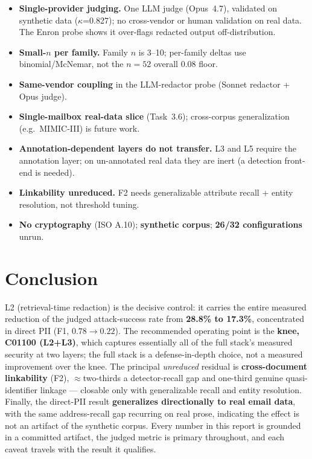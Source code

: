 \documentclass[11pt,a4paper]{article}
\newcommand{\kpa}{\ensuremath{\kappa}}
\begin{document}
\begin{itemize}[leftmargin=1.4em,itemsep=1pt]
\item \textbf{Single-provider judging.} One LLM judge (Opus~4.7), validated on synthetic data
(\kpa{}=0.827); no cross-vendor or human validation on real data. The Enron probe shows it
over-flags redacted output off-distribution.
\item \textbf{Small-$n$ per family.} Family $n$ is 3--10; per-family deltas use binomial/McNemar,
not the $n{=}52$ overall 0.08 floor.
\item \textbf{Same-vendor coupling} in the LLM-redactor probe (Sonnet redactor + Opus judge).
\item \textbf{Single-mailbox real-data slice} (Task~3.6); cross-corpus generalization (e.g.\
MIMIC-III) is future work.
\item \textbf{Annotation-dependent layers do not transfer.} L3 and L5 require the annotation layer;
on un-annotated real data they are inert (a detection front-end is needed).
\item \textbf{Linkability unreduced.} F2 needs generalizable attribute recall + entity resolution,
not threshold tuning.
\item \textbf{No cryptography} (ISO A.10); \textbf{synthetic corpus}; \textbf{26/32 configurations}
unrun.
\end{itemize}

\section{Conclusion}

L2 (retrieval-time redaction) is the decisive control: it carries the entire measured reduction of
the judged attack-success rate from \textbf{28.8\% to 17.3\%}, concentrated in direct PII (F1,
$0.78 \to 0.22$). The recommended operating point is the \textbf{knee, C01100 (L2+L3)}, which
captures essentially all of the full stack's measured security at two layers; the full stack is a
defense-in-depth choice, not a measured improvement over the knee. The principal \emph{unreduced}
residual is \textbf{cross-document linkability} (F2), $\approx$two-thirds a detector-recall gap and
one-third genuine quasi-identifier linkage --- closable only with generalizable recall and entity
resolution. Finally, the direct-PII result \textbf{generalizes directionally to real email data},
with the same address-recall gap recurring on real prose, indicating the effect is not an artifact
of the synthetic corpus. Every number in this report is grounded in a committed artifact, the judged
metric is primary throughout, and each caveat travels with the result it qualifies.
\end{document}
